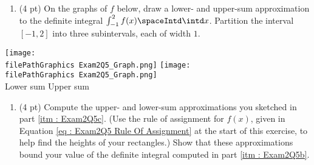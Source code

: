 \begin{enumerate}[resume,label=(\alph*)]
\item\label{itm : Exam2Q5c} (4 pt) On the graphs of $f$ below, draw a lower- and upper-sum approximation to the definite integral $\int_{-1}^{2} f(x) \spaceIntd \intd x$. Partition the interval $[-1,2]$ into three subintervals, each of width $1$.
\end{enumerate}
\begin{center}
\texttt{[image: \\filePathGraphics Exam2Q5\_Graph.png]}%
\hspace{0.5in}
\texttt{[image: \\filePathGraphics Exam2Q5\_Graph.png]}%
\\
Lower sum
\hspace{2.25in}
Upper sum
\end{center}

\spaceSolution{0in}{%
}%



\begin{enumerate}[resume,label=(\alph*)]
\item\label{itm : Exam2Q5d} (4 pt) Compute the upper- and lower-sum approximations you sketched in part \ref{itm : Exam2Q5c}. (Use the rule of assignment for $f(x)$, given in Equation \eqref{eq : Exam2Q5 Rule Of Assignment} at the start of this exercise, to help find the heights of your rectangles.) Show that these approximations bound your value of the definite integral computed in part \ref{itm : Exam2Q5b}.
\end{enumerate}




